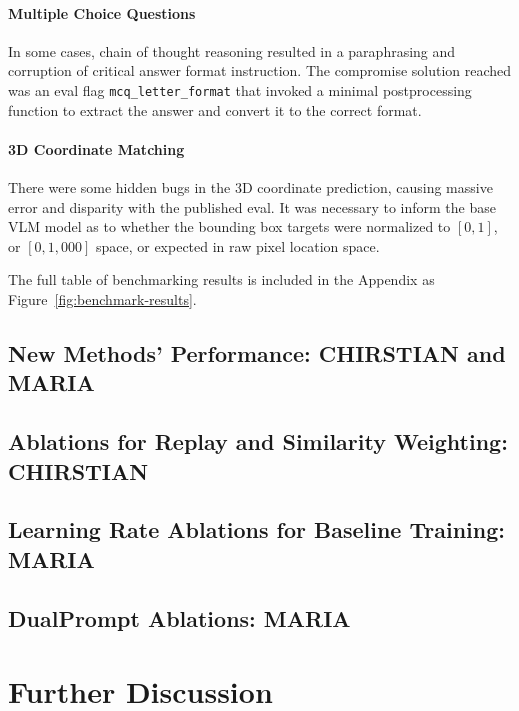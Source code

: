 \documentclass{article}
\begin{document}
\paragraph*{Multiple Choice Questions} In some cases, chain of thought reasoning resulted in a paraphrasing
and corruption of critical answer format instruction. The compromise solution reached was an eval flag
\texttt{mcq\_letter\_format} that invoked a minimal postprocessing function to extract the answer and convert
it to the correct format.

\paragraph*{3D Coordinate Matching} There were some hidden bugs in the 3D coordinate prediction, causing
massive error and disparity with the published eval. It was necessary to inform the base VLM model as to whether the
bounding box targets were normalized to $[0, 1]$, or $[0, 1,000]$ space, or expected in raw pixel location space.

The full table of benchmarking results is included in the Appendix as Figure~\ref{fig:benchmark-results}.

\subsection{New Methods' Performance: CHIRSTIAN and MARIA}

\subsection{Ablations for Replay and Similarity Weighting: CHIRSTIAN}

\subsection{Learning Rate Ablations for Baseline Training: MARIA}

\subsection{DualPrompt Ablations: MARIA}

\section{Further Discussion}
\end{document}
